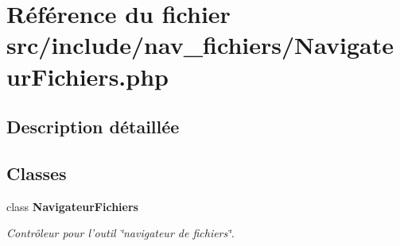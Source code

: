 \section{Référence du fichier src/include/nav\_\-fichiers/NavigateurFichiers.php}
\label{_navigateur_fichiers_8php}


\subsection{Description détaillée}


\subsection*{Classes}
\begin{CompactItemize}
\item 
class {\bf NavigateurFichiers}
\begin{CompactList}\small\item\em Contrôleur pour l'outil \char`\"{}navigateur de fichiers\char`\"{}. \item\end{CompactList}\end{CompactItemize}

